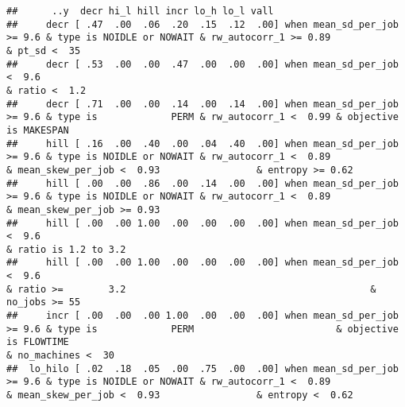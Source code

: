 \documentclass[
]{article}
\begin{document}
\begin{verbatim}
##      ..y  decr hi_l hill incr lo_h lo_l vall                                                                                                                                                                                                                              
##     decr [ .47  .00  .06  .20  .15  .12  .00] when mean_sd_per_job >= 9.6 & type is NOIDLE or NOWAIT & rw_autocorr_1 >= 0.89                                               & pt_sd <  35                                                                                  
##     decr [ .53  .00  .00  .47  .00  .00  .00] when mean_sd_per_job <  9.6                                                                            & ratio <  1.2                                                                                                       
##     decr [ .71  .00  .00  .14  .00  .14  .00] when mean_sd_per_job >= 9.6 & type is             PERM & rw_autocorr_1 <  0.99 & objective is MAKESPAN                                                                                                                      
##     hill [ .16  .00  .40  .00  .04  .40  .00] when mean_sd_per_job >= 9.6 & type is NOIDLE or NOWAIT & rw_autocorr_1 <  0.89                                                             & mean_skew_per_job <  0.93                 & entropy >= 0.62                    
##     hill [ .00  .00  .86  .00  .14  .00  .00] when mean_sd_per_job >= 9.6 & type is NOIDLE or NOWAIT & rw_autocorr_1 <  0.89                                                             & mean_skew_per_job >= 0.93                                                      
##     hill [ .00  .00 1.00  .00  .00  .00  .00] when mean_sd_per_job <  9.6                                                                            & ratio is 1.2 to 3.2                                                                                                
##     hill [ .00  .00 1.00  .00  .00  .00  .00] when mean_sd_per_job <  9.6                                                                            & ratio >=        3.2                                           & no_jobs >= 55                                      
##     incr [ .00  .00  .00 1.00  .00  .00  .00] when mean_sd_per_job >= 9.6 & type is             PERM                         & objective is FLOWTIME                                                                                                   & no_machines <  30
##  lo_hilo [ .02  .18  .05  .00  .75  .00  .00] when mean_sd_per_job >= 9.6 & type is NOIDLE or NOWAIT & rw_autocorr_1 <  0.89                                                             & mean_skew_per_job <  0.93                 & entropy <  0.62                    

\end{verbatim}
\end{document}
